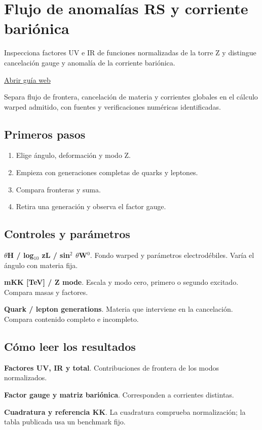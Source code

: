 \documentclass[11pt,a4paper]{article}
\begin{document}
\section{Flujo de anomalías RS y corriente bariónica}
Inspecciona factores UV e IR de funciones normalizadas de la torre Z y distingue cancelación gauge y anomalía de la corriente bariónica.

\href{https://karlesmarin.github.io/ghu-explorer/guide/es/rsanomaly/index.html}{Abrir guía web}

Separa flujo de frontera, cancelación de materia y corrientes globales en el cálculo warped admitido, con fuentes y verificaciones numéricas identificadas.
\subsection*{Primeros pasos}
\begin{enumerate}
\item Elige ángulo, deformación y modo Z.
\item Empieza con generaciones completas de quarks y leptones.
\item Compara fronteras y suma.
\item Retira una generación y observa el factor gauge.
\end{enumerate}
\subsection*{Controles y parámetros}
\textbf{\ensuremath{\theta}H / log\ensuremath{{}_{10}} zL / sin\ensuremath{{}^{2}} \ensuremath{\theta}W\ensuremath{{}^{0}}}. Fondo warped y parámetros electrodébiles. Varía el ángulo con materia fija.

\textbf{mKK [TeV] / Z mode}. Escala y modo cero, primero o segundo excitado. Compara masas y factores.

\textbf{Quark / lepton generations}. Materia que interviene en la cancelación. Compara contenido completo e incompleto.

\subsection*{Cómo leer los resultados}
\textbf{Factores UV, IR y total}. Contribuciones de frontera de los modos normalizados.

\textbf{Factor gauge y matriz bariónica}. Corresponden a corrientes distintas.

\textbf{Cuadratura y referencia KK}. La cuadratura comprueba normalización; la tabla publicada usa un benchmark fijo.
\end{document}
